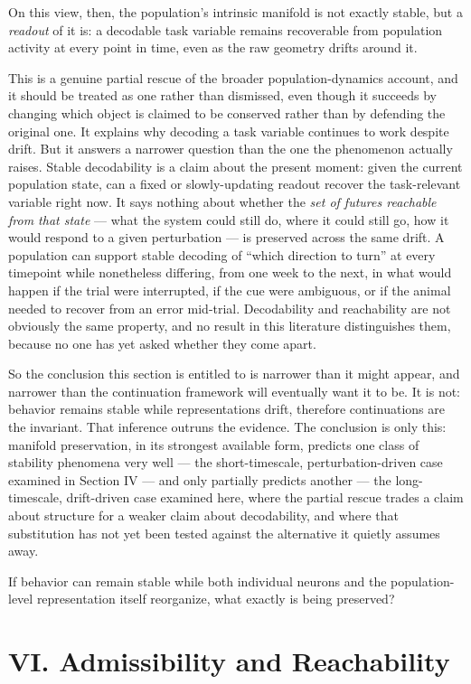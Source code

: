 \documentclass[11pt]{article}
\begin{document}
On this view, then, the population's intrinsic manifold is not exactly stable, but a \textit{readout} of it is: a decodable task variable remains recoverable from population activity at every point in time, even as the raw geometry drifts around it.

This is a genuine partial rescue of the broader population-dynamics account, and it should be treated as one rather than dismissed, even though it succeeds by changing which object is claimed to be conserved rather than by defending the original one. It explains why decoding a task variable continues to work despite drift. But it answers a narrower question than the one the phenomenon actually raises. Stable decodability is a claim about the present moment: given the current population state, can a fixed or slowly-updating readout recover the task-relevant variable right now. It says nothing about whether the \textit{set of futures reachable from that state} — what the system could still do, where it could still go, how it would respond to a given perturbation — is preserved across the same drift. A population can support stable decoding of ``which direction to turn'' at every timepoint while nonetheless differing, from one week to the next, in what would happen if the trial were interrupted, if the cue were ambiguous, or if the animal needed to recover from an error mid-trial. Decodability and reachability are not obviously the same property, and no result in this literature distinguishes them, because no one has yet asked whether they come apart.

So the conclusion this section is entitled to is narrower than it might appear, and narrower than the continuation framework will eventually want it to be. It is not: behavior remains stable while representations drift, therefore continuations are the invariant. That inference outruns the evidence. The conclusion is only this: manifold preservation, in its strongest available form, predicts one class of stability phenomena very well — the short-timescale, perturbation-driven case examined in Section IV — and only partially predicts another — the long-timescale, drift-driven case examined here, where the partial rescue trades a claim about structure for a weaker claim about decodability, and where that substitution has not yet been tested against the alternative it quietly assumes away.

If behavior can remain stable while both individual neurons and the population-level representation itself reorganize, what exactly is being preserved?
\section*{VI. Admissibility and Reachability}
\end{document}
